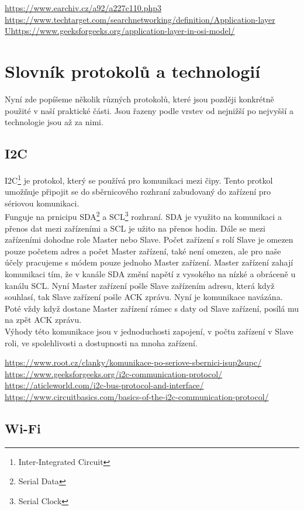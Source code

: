 \documentclass[12pt]{report}			%
\begin{document}
\url{https://www.earchiv.cz/a92/a227c110.php3}
\url{https://www.techtarget.com/searchnetworking/definition/Application-layer}
\url{Uhttps://www.geeksforgeeks.org/application-layer-in-osi-model/}

			\section{Slovník protokolů a technologií}
Nyní zde popíšeme několik různých protokolů, které jsou později konkrétně použité v naší praktické části. Jsou řazeny podle vrstev od nejnižší po nejvyšší a technologie jsou až za nimi.
				\subsection{I2C}
I2C\footnote{Inter-Integrated Circuit} je protokol, který se používá pro komunikaci mezi čipy. Tento protkol umožňuje připojit se do sběrnicového rozhraní zabudovaný do zařízení pro sériovou komunikaci. 
\\
Funguje na prnicipu SDA\footnote{Serial Data} a SCL\footnote{Serial Clock} rozhraní. SDA je využito na komunikaci a přenos dat mezi zařízeními a SCL je užito na přenos hodin. Dále se mezi zařízeními dohodne role Master nebo Slave. Počet zařízení s rolí Slave je omezen pouze početem adres a počet Master zařízení, také není omezen, ale pro naše účely pracujeme s módem pouze jednoho Master zařízení. Master zařízení zahají komunikaci tím, že v kanále SDA změní napětí z vysokého na nízké a obráceně u kanálu SCL. Nyní Master zařízení pošle Slave zařízením adresu, která když souhlasí, tak Slave zařízení pošle ACK zprávu. Nyní je komunikace navázána. Poté vždy když dostane Master zařízení rámec s daty od Slave zařízení, posílá mu na zpět ACK zprávu.
\\
Výhody této komunikace jsou v jednoduchosti zapojení, v počtu zařízení v Slave roli, ve spolehlivosti a dostupnosti na mnoha zařízení.  

\url{https://www.root.cz/clanky/komunikace-po-seriove-sbernici-isup2supc/}
\url{https://www.geeksforgeeks.org/i2c-communication-protocol/}
\url{https://aticleworld.com/i2c-bus-protocol-and-interface/}
\url{https://www.circuitbasics.com/basics-of-the-i2c-communication-protocol/}
				\subsection{Wi-Fi}
\end{document}
